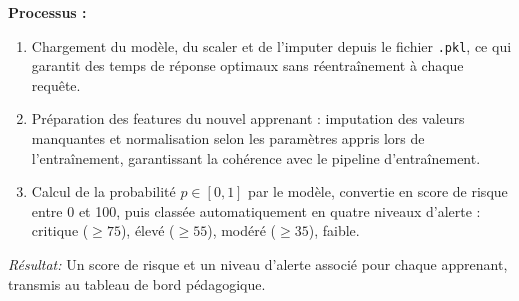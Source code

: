 \begin{itemize}[label=\textbullet]
\begin{itemize}[label=\textbullet]
    \textbf{Processus :}
    \begin{enumerate}
        \item Chargement du modèle, du scaler et de l'imputer depuis 
        le fichier \texttt{.pkl}, ce qui garantit des temps de réponse 
        optimaux sans réentraînement à chaque requête.
        \item Préparation des features du nouvel apprenant : imputation 
        des valeurs manquantes et normalisation selon les paramètres 
        appris lors de l'entraînement, garantissant la cohérence avec 
        le pipeline d'entraînement.
        \item Calcul de la probabilité $p \in [0,1]$ par le modèle, 
        convertie en score de risque entre 0 et 100, puis classée 
        automatiquement en quatre niveaux d'alerte : critique 
        ($\geq 75$), élevé ($\geq 55$), modéré ($\geq 35$), faible.
    \end{enumerate}
    \textit{Résultat:} Un score de risque et un niveau d'alerte 
    associé pour chaque apprenant, transmis au tableau de bord 
    pédagogique.

\end{itemize}
\end{itemize}




